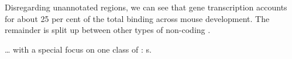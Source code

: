 
Disregarding unannotated regions, we can see that \trna gene transcription
accounts for about \num{25} per cent of the total  binding across mouse
development. The remainder is split up between other types of non-coding
\rna[s].

… with a special focus on one class
of : s.


